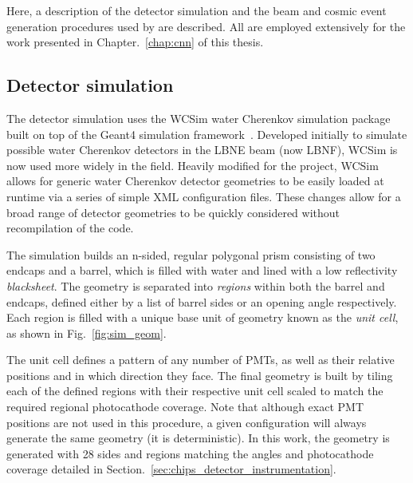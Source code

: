 Here, a description of the detector simulation and the beam and cosmic event generation procedures
used by \chips are described. All are employed extensively for the work presented in
Chapter.~\ref{chap:cnn} of this thesis.

\subsection{Detector simulation} %
\label{sec:chips_monte_carlo_sim} %

The detector simulation uses the WCSim water Cherenkov simulation package~\cite{wcsim2020} built
on top of the Geant4 simulation framework~\cite{agostinelli2003, allison2006, allison2016}.
Developed initially to simulate possible water Cherenkov detectors in the LBNE beam (now LBNF),
WCSim is now used more widely in the field. Heavily modified for the \chips project, WCSim allows
for generic water Cherenkov detector geometries to be easily loaded at runtime via a series of
simple XML configuration files. These changes allow for a broad range of detector geometries to be
quickly considered without recompilation of the code.

The simulation builds an n-sided, regular polygonal prism consisting of two endcaps and a barrel,
which is filled with water and lined with a low reflectivity \emph{blacksheet}. The geometry is
separated into \emph{regions} within both the barrel and endcaps, defined either by a list of
barrel sides or an opening angle respectively. Each region is filled with a unique base unit of
geometry known as the \emph{unit cell}, as shown in Fig.~\ref{fig:sim_geom}.

The unit cell defines a pattern of any number of PMTs, as well as their relative positions and in
which direction they face. The final geometry is built by tiling each of the defined regions with
their respective unit cell scaled to match the required regional photocathode coverage. Note that
although exact PMT positions are not used in this procedure, a given configuration will always
generate the same geometry (it is deterministic). In this work, the \chipsfive geometry is
generated with 28 sides and regions matching the angles and photocathode coverage detailed in
Section.~\ref{sec:chips_detector_instrumentation}.

